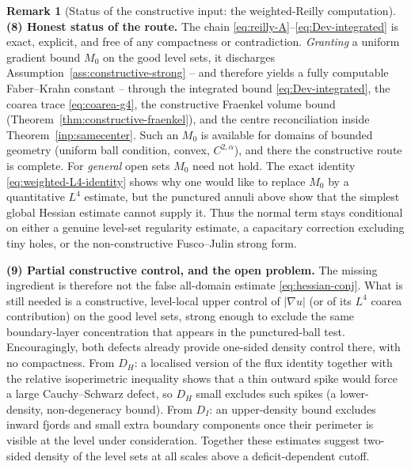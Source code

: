 \documentclass[11pt]{amsart}
\theoremstyle{definition}
\newtheorem{remark}[theorem]{Remark}
\begin{document}
\begin{remark}[Status of the constructive input: the weighted-Reilly computation]
\medskip
\noindent\textbf{(8) Honest status of the route.}
The chain \eqref{eq:reilly-A}--\eqref{eq:Dev-integrated} is exact, explicit, and
free of any compactness or contradiction.  \emph{Granting} a uniform gradient
bound \(M_0\) on the good level sets, it discharges
Assumption~\ref{ass:constructive-strong} -- and therefore yields a fully
computable Faber--Krahn constant -- through the integrated bound
\eqref{eq:Dev-integrated}, the coarea trace \eqref{eq:coarea-g4}, the constructive
Fraenkel volume bound (Theorem~\ref{thm:constructive-fraenkel}), and the centre
reconciliation inside Theorem~\ref{inp:samecenter}.  Such an \(M_0\) is available
for domains of bounded geometry (uniform ball condition, convex, \(C^{2,\alpha}\)),
and there the constructive route is complete.  For \emph{general} open sets
\(M_0\) need not hold.  The exact identity \eqref{eq:weighted-L4-identity} shows
why one would like to replace \(M_0\) by a quantitative \(L^4\) estimate, but the
punctured annuli above show that the simplest global Hessian estimate cannot
supply it.  Thus the normal term stays conditional on either a genuine level-set
regularity estimate, a capacitary correction excluding tiny holes, or the
non-constructive Fusco--Julin strong form.

\medskip
\noindent\textbf{(9) Partial constructive control, and the open problem.}
The missing ingredient is therefore not the false all-domain estimate
\eqref{eq:hessian-conj}.  What is still needed is a constructive, level-local
upper control of \(|\nabla u|\) (or of its \(L^4\) coarea contribution) on the
good level sets, strong enough to exclude the same boundary-layer concentration
that appears in the punctured-ball test.  Encouragingly, both defects already
provide one-sided density control there, with no compactness.  From \(D_H\): a
localised version of the flux identity together with the relative isoperimetric
inequality shows that a thin outward spike would force a large Cauchy--Schwarz
defect, so \(D_H\) small excludes such spikes (a lower-density, non-degeneracy
bound).  From \(D_I\): an upper-density bound excludes inward fjords and small
extra boundary components once their perimeter is visible at the level under
consideration.  Together these estimates suggest two-sided density of the level
sets at all scales above a deficit-dependent cutoff.


\end{remark}
\end{document}
